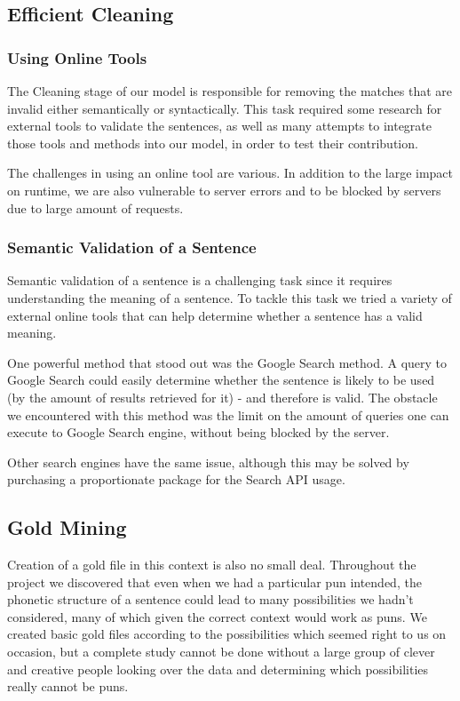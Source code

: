 \documentclass[11pt,a4paper]{article}
\begin{document}
\subsection{Efficient Cleaning}
\subsubsection{Using Online Tools}

The Cleaning stage of our model is responsible for removing the matches that are invalid either semantically or syntactically. This task required some research for external tools to validate the sentences, as well as many attempts to integrate those tools and methods into our model, in order to test their contribution. 

The challenges in using an online tool are various. In addition to the large impact on runtime, we are also vulnerable to server errors and to be blocked by servers due to large amount of requests. 

\subsubsection{Semantic Validation of a Sentence}
Semantic validation of a sentence is a challenging task since it requires understanding the meaning of a sentence.
To tackle this task we tried a variety of external online tools that can help determine whether a sentence has a valid meaning.

One powerful method that stood out was the Google Search method. A query to Google Search could easily determine whether the sentence is likely to be used (by the amount of results retrieved for it) - and therefore is valid. The obstacle we encountered with this method was the limit on the amount of queries one can execute to Google Search engine, without being blocked by the server. 

Other search engines have the same issue, although this may be solved by purchasing a proportionate package for the Search API usage.

\subsection{Gold Mining}
Creation of a gold file in this context is also no small deal. Throughout the project we discovered that even when we had a particular pun intended, the phonetic structure of a sentence could lead to many possibilities we hadn't considered, many of which given the correct context would work as puns. We created basic gold files according to the possibilities which seemed right to us on occasion, but a complete study cannot be done without a large group of clever and creative people looking over the data and determining which possibilities really cannot be puns.
\end{document}
